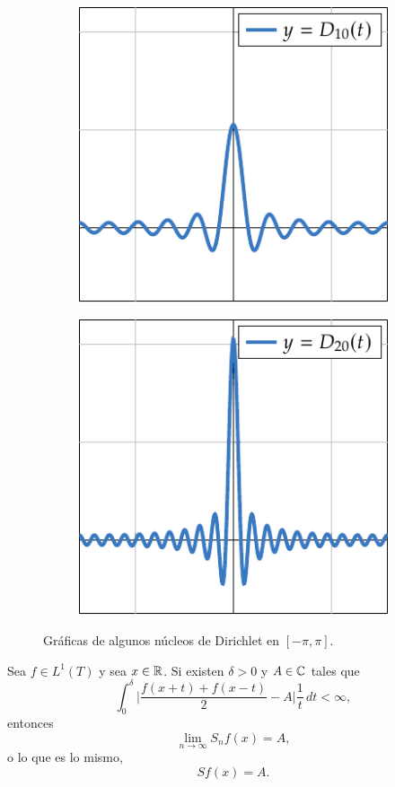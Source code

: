 \documentclass[a4paper, 11pt, oneside]{report}
\begin{document}
\begin{figure}[H]
  \centering
  \begin{subfigure}[b]{0.49\textwidth}
    \centering
    \includegraphics{./plot17/main.pdf}
  \end{subfigure}
  \begin{subfigure}[b]{0.49\textwidth}
    \centering
    \includegraphics{./plot18/main.pdf}
  \end{subfigure}
  \caption{Gráficas de algunos núcleos de Dirichlet en $[-\pi,\pi]$.}
\end{figure}

\begin{theorem}\label{teo:4.2.3}
  Sea $f \in L^1(T)$ y sea $x \in \mathbb R$. Si existen $\delta > 0$ y $A \in \mathbb C$ tales que
  \[\int_0^\delta \biggl|\frac{f(x+t)+f(x-t)}{2}-A\biggr|\frac{1}{t} \, dt < \infty,\]
  entonces
  \[\lim_{n \to \infty} S_nf(x) = A,\]
  o lo que es lo mismo,
  \[Sf(x) = A.\]
\end{theorem}
\end{document}
